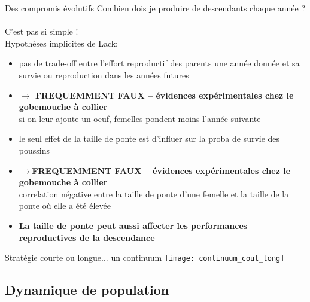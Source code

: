 \documentclass[10pt]{beamer}
\begin{document}
\begin{frame}{Des compromis évolutifs}
  Combien dois je produire de descendants chaque année ?\\~\\
  C'est pas si simple ! \\
  Hypothèses implicites de Lack:
  \begin{itemize}[<+->]
  \item pas de trade-off entre l’effort reproductif des parents une année donnée
    et sa survie ou reproduction dans les années futures
  \item \textbf{$\rightarrow$ FREQUEMMENT FAUX – évidences expérimentales chez le
      gobemouche à collier} \\ si on leur ajoute un oeuf, femelles pondent
    moins l’année suivante
  \item le seul effet de la taille de ponte est d’influer sur la proba de
    survie des poussins
  \item  \textbf{$\rightarrow$FREQUEMMENT FAUX – évidences expérimentales chez le
      gobemouche à collier }\\ correlation négative entre la taille de ponte d’une femelle et
    la taille de la ponte où elle a été élevée
  \item \textbf{La taille de ponte peut aussi affecter les performances reproductives
      de la descendance}
  \end{itemize}
\end{frame}



 \begin{frame}{Stratégie courte ou longue... un continuum}
   \texttt{[image: continuum\_cout\_long]}
 \end{frame}




\subsection{Dynamique de population}
\end{document}
